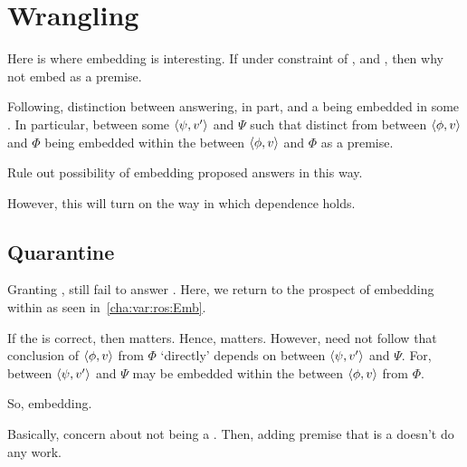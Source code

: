 \section{Wrangling}
\label{sec:wrangling}

\begin{note}
  Here is where embedding is interesting.
  If under constraint of \agpe{}, and \fc{}, then why not embed \fc{} as a premise.

  
\end{note}

\begin{note}
  Following, distinction between \ros{} answering, in part, \qWhyV{} and a \ros{} being embedded in some \ros{}.
  In particular, \ros{} between some \(\langle \psi, v' \rangle\) and \(\Psi\) such that distinct from \ros{} between \(\langle \phi, v \rangle\) and \(\Phi\) being embedded within the \ros{} between \(\langle \phi, v \rangle\) and \(\Phi\) as a premise.
\end{note}

\begin{note}
  Rule out possibility of embedding proposed answers in this way.

  However, this will turn on the way in which dependence holds.
\end{note}

\subsection{Quarantine}

\begin{note}
  Granting \agpe{}, still fail to answer \qWhyV{}.
  Here, we return to the prospect of embedding  within  as seen in~\autoref{cha:var:ros:Emb}.

  If the \agpe{} is correct, then \fc{} matters.
  Hence, \ros{} matters.
  However, need not follow that conclusion of \(\langle \phi, v \rangle\) from \(\Phi\) `directly' depends on \ros{} between \(\langle \psi, v' \rangle\) and \(\Psi\).
  For, \ros{} between \(\langle \psi, v' \rangle\) and \(\Psi\) may be embedded within the \ros{} between \(\langle \phi, v \rangle\) from \(\Phi\).
\end{note}

\begin{note}
  So, embedding.

  Basically, concern about not being a \fc{}.
  Then, adding premise that is a \fc{} doesn't do any work.
\end{note}

